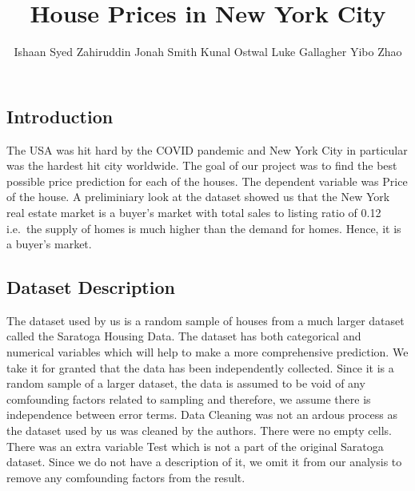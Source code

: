 \documentclass[letterpaper,9pt,twocolumn,twoside,]{pinp}
\title{House Prices in New York City}
\author[]{Ishaan Syed Zahiruddin \textbar{} Jonah Smith \textbar{} Kunal
Ostwal \textbar{} Luke Gallagher \textbar{} Yibo Zhao}
\begin{document}
\verticaladjustment{-2pt}

\maketitle
\thispagestyle{firststyle}



\hypertarget{introduction}{%
\subsection{Introduction}\label{introduction}}

The USA was hit hard by the COVID pandemic and New York City in
particular was the hardest hit city worldwide. The goal of our project
was to find the best possible price prediction for each of the houses.
The dependent variable was Price of the house. A preliminiary look at
the dataset showed us that the New York real estate market is a buyer's
market with total sales to listing ratio of 0.12 i.e.~the supply of
homes is much higher than the demand for homes. Hence, it is a buyer's
market.

\hypertarget{dataset-description}{%
\subsection{Dataset Description}\label{dataset-description}}

The dataset used by us is a random sample of houses from a much larger
dataset called the Saratoga Housing Data. The dataset has both
categorical and numerical variables which will help to make a more
comprehensive prediction. We take it for granted that the data has been
independently collected. Since it is a random sample of a larger
dataset, the data is assumed to be void of any comfounding factors
related to sampling and therefore, we assume there is independence
between error terms. Data Cleaning was not an ardous process as the
dataset used by us was cleaned by the authors. There were no empty
cells. There was an extra variable Test which is not a part of the
original Saratoga dataset. Since we do not have a description of it, we
omit it from our analysis to remove any comfounding factors from the
result.
\end{document}

